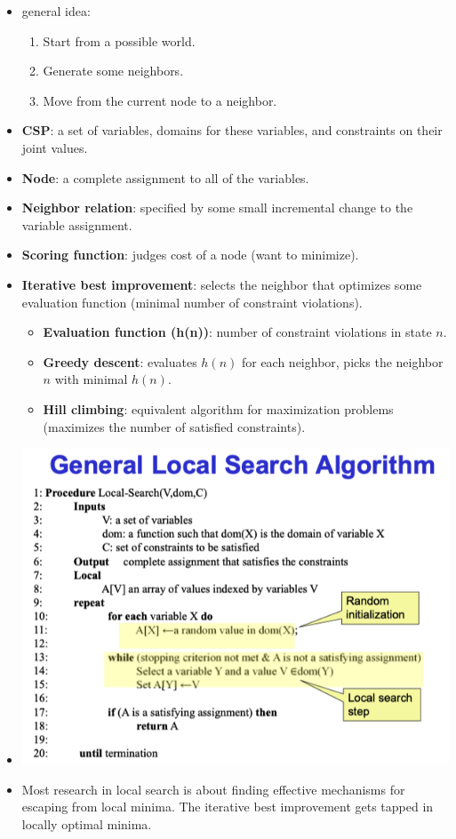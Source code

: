 \documentclass{article}
\begin{document}
\begin{itemize}
    \item general idea:
        \begin{enumerate}
            \item Start from a possible world.
            \item Generate some neighbors.
            \item Move from the current node to a neighbor.
        \end{enumerate}
    \item \textbf{CSP}: a set of variables, domains for these variables, and constraints on their joint values.
    \item \textbf{Node}: a complete assignment to all of the variables.
    \item \textbf{Neighbor relation}: specified by some small incremental change to the variable assignment.
    \item \textbf{Scoring function}: judges cost of a node (want to minimize).
    \item \textbf{Iterative best improvement}: selects the neighbor that optimizes some evaluation function (minimal number of constraint violations).
        \begin{itemize}
            \item \textbf{Evaluation function (h(n))}: number of constraint violations in state $n$.
            \item \textbf{Greedy descent}: evaluates $h(n)$ for each neighbor, picks the neighbor $n$ with minimal $h(n)$.
            \item \textbf{Hill climbing}: equivalent algorithm for maximization problems (maximizes the number of satisfied constraints).
        \end{itemize}
    \item
        \includegraphics[scale=0.6]{general_local_search_algorithm}
    \item Most research in local search is about finding effective mechanisms for escaping from local minima. The iterative best improvement gets tapped in locally optimal minima.
\end{itemize}
\end{document}
